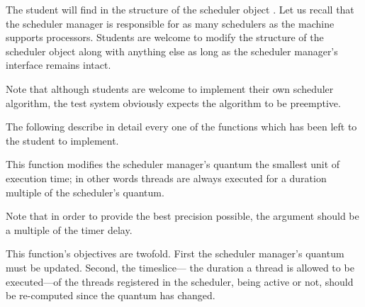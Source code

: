 The student will find in  the structure of the
scheduler object . Let us recall that the scheduler
manager is responsible for as many schedulers as the machine supports
processors. Students are welcome to modify the structure of the scheduler
object along with anything else as long as the scheduler manager's
interface remains intact.

Note that although students are welcome to implement their own scheduler
algorithm, the test system obviously expects the algorithm to be
preemptive.

The following describe in detail every one of the functions which has
been left to the student to implement.

         {
           This function modifies the scheduler manager's quantum \ie{}
           the smallest unit of execution time; in other words threads are
           always executed for a duration multiple of the scheduler's quantum.

           \-

           Note that in order to provide the best precision possible, the
           argument  should be a multiple of the timer
           delay.

           \-

           This function's objectives are twofold. First the scheduler
           manager's quantum must be updated. Second, the timeslice---\ie{}
           the duration a thread is allowed to be executed---of the threads
           registered in the scheduler, being active or not, should be
           re-computed since the quantum has changed.
         }

